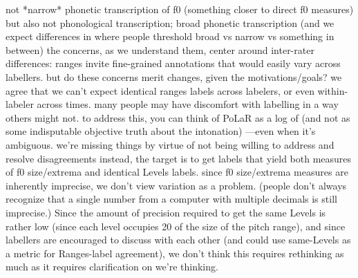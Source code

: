 {}\markdownRendererUlBeginTight
\markdownRendererUlItem {}\markdownRendererUlItemEnd 
\markdownRendererUlItem not *narrow* phonetic transcription of f0 (something closer to direct f0 measures) but also not phonological transcription; broad phonetic transcription\markdownRendererUlItemEnd 
\markdownRendererUlItem (and we expect differences in where people threshold broad vs narrow vs something in between)\markdownRendererUlItemEnd 
\markdownRendererUlEndTight \markdownRendererUlItemEnd 
\markdownRendererUlEndTight \markdownRendererUlItemEnd 
\markdownRendererUlEndTight \markdownRendererUlItemEnd 
\markdownRendererUlItem the concerns, as we understand them, center around inter-rater differences: ranges invite fine-grained annotations that would easily vary across labellers. but do these concerns merit changes, given the motivations/goals?\markdownRendererInterblockSeparator
{}\markdownRendererUlBeginTight
\markdownRendererUlItem {} we agree that we can't expect identical ranges labels across labelers, or even within-labeler across times.\markdownRendererInterblockSeparator
{}\markdownRendererUlBeginTight
\markdownRendererUlItem many people may have discomfort with labelling in a way others might not. to address this, you can think of PoLaR as a log of  (and not as some indisputable objective truth about the intonation) —\markdownRendererNbsp{}even when it’s ambiguous.\markdownRendererUlItemEnd 
\markdownRendererUlItem we’re missing things by virtue of not being willing to address and resolve disagreements\markdownRendererUlItemEnd 
\markdownRendererUlEndTight \markdownRendererUlItemEnd 
\markdownRendererUlItem instead, the target is to get labels that yield both  measures of f0 size/extrema and identical Levels labels.\markdownRendererInterblockSeparator
{}\markdownRendererUlBeginTight
\markdownRendererUlItem since f0 size/extrema measures are inherently imprecise, we don't view variation as a problem. (people don’t always recognize that a single number from a computer with multiple decimals is still imprecise.)\markdownRendererUlItemEnd 
\markdownRendererUlEndTight \markdownRendererUlItemEnd 
\markdownRendererUlItem Since the amount of precision required to get the same Levels is rather low (since each level occupies 20\markdownRendererPercentSign{} of the size of the pitch range), and since labellers are encouraged to discuss with each other (and could use same-Levels as a metric for Ranges-label agreement), we don’t think this requires rethinking as much as it requires clarification on  we’re thinking.\markdownRendererUlItemEnd 
